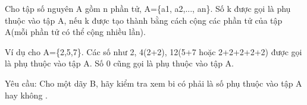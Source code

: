 Cho tập số nguyên A gồm n phần tử, A=\{a1, a2,..., an\}. Số k được gọi là phụ thuộc vào tập A, nếu k được tạo thành bằng cách cộng các phần tử của tập A(mỗi phần tử có thể cộng nhiều lần).  

   Ví dụ  cho A=\{2,5,7\}.  Các số như 2, 4(2+2), 12(5+7 hoặc 2+2+2+2+2) được gọi là phụ thuộc vào tập A. Số 0 cũng gọi là phụ thuộc vào tập A.  

Yêu cầu:
Cho một dãy B, hãy kiểm tra xem bi có phải là số phụ thuộc vào tập A hay không .